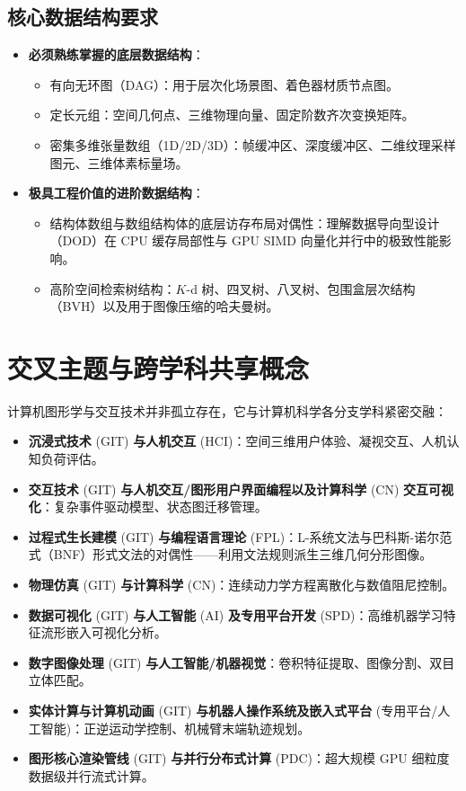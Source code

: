 \subsection{核心数据结构要求}
\begin{itemize}
    \item \textbf{必须熟练掌握的底层数据结构}：
    \begin{itemize}
        \item 有向无环图（DAG）：用于层次化场景图、着色器材质节点图。
        \item 定长元组：空间几何点、三维物理向量、固定阶数齐次变换矩阵。
        \item 密集多维张量数组（1D/2D/3D）：帧缓冲区、深度缓冲区、二维纹理采样图元、三维体素标量场。
    \end{itemize}
    \item \textbf{极具工程价值的进阶数据结构}：
    \begin{itemize}
        \item 结构体数组与数组结构体的底层访存布局对偶性：理解数据导向型设计（DOD）在 CPU 缓存局部性与 GPU SIMD 向量化并行中的极致性能影响。
        \item 高阶空间检索树结构：$K$-d 树、四叉树、八叉树、包围盒层次结构（BVH）以及用于图像压缩的哈夫曼树。
    \end{itemize}
\end{itemize}

\section{交叉主题与跨学科共享概念}

计算机图形学与交互技术并非孤立存在，它与计算机科学各分支学科紧密交融：
\begin{itemize}
    \item \textbf{沉浸式技术} (GIT) \textbf{与人机交互} (HCI)：空间三维用户体验、凝视交互、人机认知负荷评估。
    \item \textbf{交互技术} (GIT) \textbf{与人机交互/图形用户界面编程以及计算科学} (CN) \textbf{交互可视化}：复杂事件驱动模型、状态图迁移管理。
    \item \textbf{过程式生长建模} (GIT) \textbf{与编程语言理论} (FPL)：L-系统文法与巴科斯-诺尔范式（BNF）形式文法的对偶性——利用文法规则派生三维几何分形图像。
    \item \textbf{物理仿真} (GIT) \textbf{与计算科学} (CN)：连续动力学方程离散化与数值阻尼控制。
    \item \textbf{数据可视化} (GIT) \textbf{与人工智能} (AI) \textbf{及专用平台开发} (SPD)：高维机器学习特征流形嵌入可视化分析。
    \item \textbf{数字图像处理} (GIT) \textbf{与人工智能/机器视觉}：卷积特征提取、图像分割、双目立体匹配。
    \item \textbf{实体计算与计算机动画} (GIT) \textbf{与机器人操作系统及嵌入式平台} (专用平台/人工智能)：正逆运动学控制、机械臂末端轨迹规划。
    \item \textbf{图形核心渲染管线} (GIT) \textbf{与并行分布式计算} (PDC)：超大规模 GPU 细粒度数据级并行流式计算。
\end{itemize}

